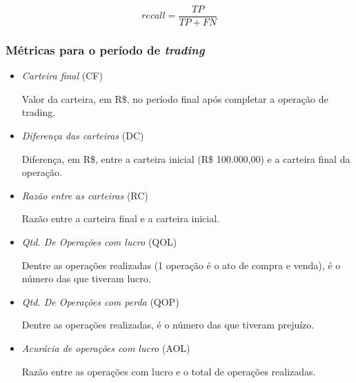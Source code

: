 \begin{equation}
recall = \frac{TP}{TP + FN}
\end{equation}


\subsubsection{Métricas para o período de \textit{trading}}

\begin{itemize}
\item{\textit{Carteira final} (CF) \par
Valor da carteira, em R\$, no período final após completar a operação de trading.}
\end{itemize}


\begin{itemize}
\item{\textit{Diferença das carteiras} (DC) \par
Diferença, em R\$, entre a carteira inicial (R\$ 100.000,00) e a carteira final da operação.}
\end{itemize}

\begin{itemize}
\item{\textit{Razão entre as carteiras} (RC) \par
Razão entre a carteira final e a carteira inicial.}
\end{itemize}

\begin{itemize}
\item{\textit{Qtd. De Operações com lucro} (QOL) \par
Dentre as operações realizadas (1 operação é o ato de compra e venda), é o número das que tiveram lucro.}
\end{itemize}


\begin{itemize}
\item{\textit{Qtd. De Operações com perda} (QOP) \par
Dentre as operações realizadas, é o número das que tiveram prejuízo.}
\end{itemize}


\begin{itemize}
\item{\textit{Acurácia de operações com lucro} (AOL) \par
Razão entre as operações com lucro e o total de operações realizadas.}
\end{itemize}


